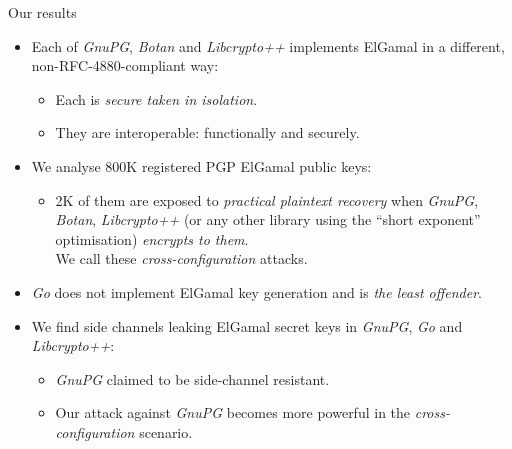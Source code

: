 \documentclass[aspectratio=169]{beamer}
\begin{document}
{
  {
  }
\begin{frame}{Our results}
  \begin{itemize}
    \setlength{\itemsep}{1em}
  \item Each of \emph{GnuPG}, \emph{Botan} and \emph{Libcrypto++}
    implements ElGamal in a different, non-RFC-4880-compliant way:
    \begin{itemize}
    \item Each is \emph{secure taken in isolation}.
    \item They are interoperable: functionally and securely.
    \end{itemize}
  \item We analyse 800K registered PGP ElGamal public keys:
    \begin{itemize}
    \item 2K of them are exposed to \emph{practical plaintext
        recovery} when \emph{GnuPG}, \emph{Botan}, \emph{Libcrypto++}
      (or any other library using the ``short exponent'' optimisation)
      \emph{encrypts to them}.\\
      We call these \emph{cross-configuration} attacks.
    \end{itemize}
  \item \emph{Go} does not implement ElGamal key generation and is \emph{the
    least offender}.
  \item We find side channels leaking ElGamal secret keys in \emph{GnuPG}, \emph{Go} and
    \emph{Libcrypto++}:
    \begin{itemize}
    \item \emph{GnuPG} claimed to be side-channel resistant.
    \item Our attack against \emph{GnuPG} becomes more powerful in the
      \emph{cross-configuration} scenario.
    \end{itemize}
  \end{itemize}
\end{frame}
}
\end{document}
